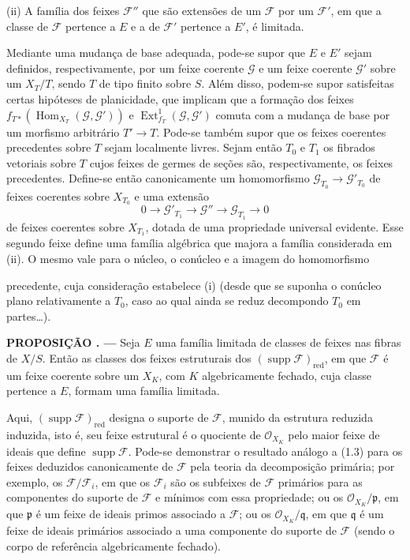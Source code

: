 \documentclass[11pt,twoside,openany]{book}
\numberwithin{equation}{section}
\newcommand{\src}[1]{%
  \phantomsection\hypertarget{src:#1}{}%
  \marginpar{\raggedleft\footnotesize\sffamily #1}%
}
\theoremstyle{plain}
\theoremstyle{definition}
\theoremstyle{remark}
\newcommand{\result}[2]{%
  \par\medskip\noindent\textbf{#1%
  \if\relax\detokenize{#2}\relax\else\space#2\fi. ---}\enspace
}
\newcommand{\FgaUnitKey}{frontmatter}
\renewcommand{\src}[1]{%
  \phantomsection\hypertarget{src:\FgaUnitKey:#1}{}%
  \marginpar{\raggedleft\footnotesize\sffamily #1}%
}
\begin{document}
\smallskip
\noindent (ii) A família dos feixes $\mathcal F''$ que são extensões de um
$\mathcal F$ por um $\mathcal F'$, em que a classe de $\mathcal F$ pertence
a $E$ e a de $\mathcal F'$ pertence a $E'$, é limitada.

Mediante uma mudança de base adequada, pode-se supor que $E$ e $E'$ sejam
definidos, respectivamente, por um feixe coerente $\mathcal G$ e um feixe
coerente $\mathcal G'$ sobre um $X_T/T$, sendo $T$ de tipo finito sobre $S$.
Além disso, podem-se supor satisfeitas certas hipóteses de planicidade, que
implicam que a formação dos feixes
$f_{T*}(\operatorname{Hom}_{X_T}(\mathcal G,\mathcal G'))$ e
$\operatorname{Ext}^{1}_{f_T}(\mathcal G,\mathcal G')$ comuta com a mudança
de base por um morfismo arbitrário $T'\longrightarrow T$. Pode-se também
supor que os feixes coerentes precedentes sobre $T$ sejam localmente livres.
Sejam então $T_0$ e $T_1$ os fibrados vetoriais sobre $T$ cujos feixes de
germes de seções são, respectivamente, os feixes precedentes. Define-se então
canonicamente um homomorfismo
$\mathcal G_{T_0}\longrightarrow\mathcal G'_{T_0}$ de feixes coerentes sobre
$X_{T_0}$ e uma extensão
\[
0\longrightarrow\mathcal G'_{T_1}\longrightarrow\mathcal G''
\longrightarrow\mathcal G_{T_1}\longrightarrow0
\]
de feixes coerentes sobre $X_{T_1}$, dotada de uma propriedade universal
evidente. Esse segundo feixe define uma família algébrica que majora a família
considerada em (ii). O mesmo vale para o núcleo, o conúcleo e a imagem do
homomorfismo
\src{253}
precedente, cuja consideração estabelece (i) (desde que se suponha o conúcleo
plano relativamente a $T_0$, caso ao qual ainda se reduz decompondo $T_0$ em
partes\ldots).

\result{PROPOSIÇÃO}{1.3} Seja $E$ uma família limitada de classes de feixes
nas fibras de $X/S$. Então as classes dos feixes estruturais dos
$(\operatorname{supp}\mathcal F)_{\mathrm{red}}$, em que $\mathcal F$ é um
feixe coerente sobre um $X_K$, com $K$ algebricamente fechado, cuja classe
pertence a $E$, formam uma família limitada.

Aqui, $(\operatorname{supp}\mathcal F)_{\mathrm{red}}$ designa o suporte de
$\mathcal F$, munido da estrutura reduzida induzida, isto é, seu feixe
estrutural é o quociente de $\mathcal O_{X_K}$ pelo maior feixe de ideais que
define $\operatorname{supp}\mathcal F$. Pode-se demonstrar o resultado
análogo a (1.3) para os feixes deduzidos canonicamente de $\mathcal F$ pela
teoria da decomposição primária; por exemplo, os
$\mathcal F/\mathcal F_i$, em que os $\mathcal F_i$ são os subfeixes de
$\mathcal F$ primários para as componentes do suporte de $\mathcal F$ e
mínimos com essa propriedade; ou os $\mathcal O_{X_K}/\mathfrak p$, em que
$\mathfrak p$ é um feixe de ideais primos associado a $\mathcal F$; ou os
$\mathcal O_{X_K}/\mathfrak q$, em que $\mathfrak q$ é um feixe de ideais
primários associado a uma componente do suporte de $\mathcal F$ (sendo o
corpo de referência algebricamente fechado).
\end{document}
